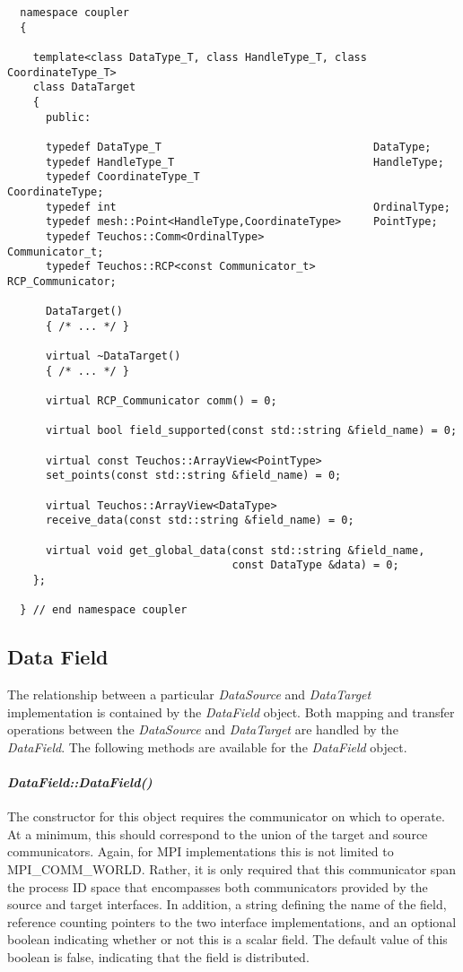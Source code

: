 \documentclass[letterpaper]{article}
\begin{document}
\begin{lstlisting}
  namespace coupler
  {

    template<class DataType_T, class HandleType_T, class CoordinateType_T>
    class DataTarget 
    {
      public:

      typedef DataType_T                                 DataType;
      typedef HandleType_T                               HandleType;
      typedef CoordinateType_T                           CoordinateType;
      typedef int                                        OrdinalType;
      typedef mesh::Point<HandleType,CoordinateType>     PointType;
      typedef Teuchos::Comm<OrdinalType>                 Communicator_t;
      typedef Teuchos::RCP<const Communicator_t>         RCP_Communicator;

      DataTarget()
      { /* ... */ }

      virtual ~DataTarget()
      { /* ... */ }

      virtual RCP_Communicator comm() = 0;

      virtual bool field_supported(const std::string &field_name) = 0;

      virtual const Teuchos::ArrayView<PointType> 
      set_points(const std::string &field_name) = 0;

      virtual Teuchos::ArrayView<DataType> 
      receive_data(const std::string &field_name) = 0;

      virtual void get_global_data(const std::string &field_name,
                                   const DataType &data) = 0;
    };

  } // end namespace coupler
\end{lstlisting}

\subsection{Data Field}
The relationship between a particular {\sl DataSource} and {\sl
  DataTarget} implementation is contained by the {\sl DataField}
object. Both mapping and transfer operations between the {\sl
  DataSource} and {\sl DataTarget} are handled by the {\sl
  DataField}. The following methods are available for the {\sl
  DataField} object.

\paragraph{\sl DataField::DataField()}
The constructor for this object requires the communicator on which to
operate. At a minimum, this should correspond to the union of the
target and source communicators. Again, for MPI implementations this
is not limited to MPI\_COMM\_WORLD. Rather, it is only required that
this communicator span the process ID space that encompasses both
communicators provided by the source and target interfaces. In
addition, a string defining the name of the field, reference counting
pointers to the two interface implementations, and an optional boolean
indicating whether or not this is a scalar field. The default value of
this boolean is false, indicating that the field is distributed.
\end{document}

